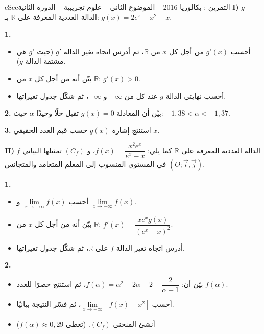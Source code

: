 \documentclass[12pt,a4paper]{article}
\newenvironment{BOX}[2]{\begin{otherlanguage}{english}\begin{arbox}{#1}{#2}}{\end{arbox}\end{otherlanguage}}
\newcounter{exo}
\newenvironment{tamrin}[1]{\stepcounter{exo}\begin{BOX}{cSec}{التمرين \theexo: #1}}{\end{BOX}}
\newcommand{\R}{\mathbb{R}}
\newenvironment{sq}{\begin{itemize}[leftmargin=2.4em,itemsep=3pt]}{\end{itemize}}
\newcommand{\qa}{\item[(أ)]}\newcommand{\qb}{\item[(ب)]}\newcommand{\qc}{\item[(جـ)]}\newcommand{\qd}{\item[(د)]}\newcommand{\qe}{\item[(هـ)]}
\newcommand{\QQ}[1]{\par\smallskip\textbf{#1.} }
\begin{document}
\begin{tamrin}{بكالوريا 2016 -- الموضوع الثاني -- علوم تجريبية -- الدورة الثانية}
\textbf{I)} $g$ الدالة العددية المعرفة على $\R$ بـ: $g(x)=2e^x-x^2-x$.

\QQ{1}
\begin{sq}
\qa أحسب $g'(x)$ من أجل كل $x$ من $\R$، ثم أدرس اتجاه تغير الدالة $g'$ (حيث $g'$ هي مشتقة الدالة $g$).
\qb بيّن أنه من أجل كل $x$ من $\R$: $g'(x)>0$.
\qc أحسب نهايتي الدالة $g$ عند كل من $+\infty$ و $-\infty$، ثم شكّل جدول تغيراتها.
\end{sq}
\QQ{2} بيّن أن المعادلة $g(x)=0$ تقبل حلًا وحيدًا $\alpha$ حيث: $-1{,}38<\alpha<-1{,}37$.
\QQ{3} استنتج إشارة $g(x)$ حسب قيم العدد الحقيقي $x$.

\textbf{II)} $f$ الدالة العددية المعرفة على $\R$ كما يلي: $f(x)=\dfrac{x^2e^x}{e^x-x}$، و $(C_f)$ تمثيلها البياني في المستوي المنسوب إلى المعلم المتعامد والمتجانس $(O;\vec i,\vec j)$.

\QQ{1}
\begin{sq}
\qa أحسب $\lim\limits_{x\to+\infty}f(x)$ و $\lim\limits_{x\to-\infty}f(x)$.
\qb بيّن أنه من أجل كل $x$ من $\R$: $f'(x)=\dfrac{xe^xg(x)}{(e^x-x)^2}$.
\qc أدرس اتجاه تغير الدالة $f$ على $\R$، ثم شكّل جدول تغيراتها.
\end{sq}
\QQ{2}
\begin{sq}
\qa بيّن أن: $f(\alpha)=\alpha^2+2\alpha+2+\dfrac{2}{\alpha-1}$، ثم استنتج حصرًا للعدد $f(\alpha)$.
\qb أحسب $\lim\limits_{x\to+\infty}\left[f(x)-x^2\right]$، ثم فسّر النتيجة بيانيًا.
\qc أنشئ المنحنى $(C_f)$. (تعطى $f(\alpha)\approx0{,}29$)
\end{sq}
\end{tamrin}
\end{document}

